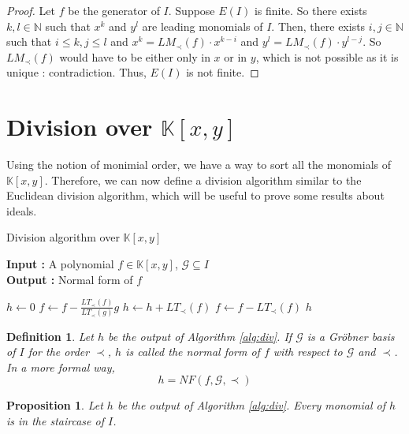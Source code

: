\documentclass{article}
\newtheorem{definition}{Definition}[section]
\newtheorem{proposition}{Proposition}[section]
\begin{document}
\begin{proof}
    Let $f$ be the generator of $I$. Suppose $E(I)$ is finite. So there exists $k, l \in \mathbb{N}$ such that $x^{k}$ and $y^{l}$ are leading monomials of $I$. Then, there exists $i, j \in \mathbb{N}$ such that $i \leq k, j \leq l$ and $x^{k} = LM_{\prec}(f) \cdot x^{k - i}$ and $y^{l} = LM_{\prec}(f) \cdot y^{l - j}$. So $LM_{\prec}(f)$ would have to be either only in $x$ or in $y$, which is not possible as it is unique : contradiction. Thus, $E(I)$ is not finite. 
\end{proof}

\section{Division over $\mathbb{K}[x, y]$}

Using the notion of monimial order, we have a way to sort all the monomials of $\mathbb{K}[x, y]$. Therefore, we can now define a division algorithm similar to the Euclidean division algorithm, which will be useful to prove some results about ideals. 

\begin{algorithm}
\caption{Division algorithm over $\mathbb{K}[x, y]$} \label{alg:div}
\textbf{Input : }A polynomial $f \in \mathbb{K}[x, y]$, $\mathscr{G} \subseteq I$ \\
\textbf{Output : }Normal form of $f$
\begin{algorithmic}
    \State $h \gets 0$
            \State $f \gets f- \displaystyle \frac{LT_{\prec}(f)}{LT_{\prec}(g)}g$
        \Else
            \State $h \gets h + LT_{\prec}(f)$
            \State $f \gets f - LT_{\prec}(f)$
        \EndIf
    \EndWhile
    \State \Return $h$
\end{algorithmic}
\end{algorithm}


\begin{definition}
Let $h$ be the output of Algorithm \ref{alg:div}. If $\mathscr{G}$ is a Gröbner basis of $I$ for the order $\prec$, $h$ is called the normal form of $f$ with respect to $\mathscr{G}$ and $\prec$. In a more formal way, 
    \begin{displaymath}
        h = NF(f, \mathscr{G}, \prec)
    \end{displaymath}
\end{definition}

\begin{proposition} \label{proposition:monomials-h-staircase}
    Let $h$ be the output of Algorithm \ref{alg:div}. Every monomial of $h$ is in the staircase of $I$.
\end{proposition}
    
\end{document}
